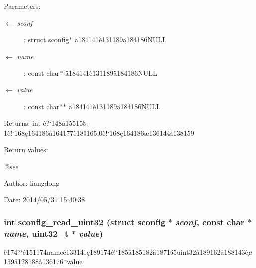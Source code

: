 \begin{Desc}
\item[Parameters:]
\begin{description}
\item[\mbox{$\leftarrow$} {\em sconf}]: struct sconfig$\ast$ \"{a}184141\`{e}131189\"{a}184186NULL \item[\mbox{$\leftarrow$} {\em name}]: const char$\ast$ \"{a}184141\`{e}131189\"{a}184186NULL \item[\mbox{$\leftarrow$} {\em value}]: const char$\ast$$\ast$ \"{a}184141\`{e}131189\"{a}184186NULL \end{description}
\end{Desc}
\begin{Desc}
\item[Returns:]int \`{e}?`148\aa{}155158-1\`{e}!`168\c{c}164186\aa{}164177\`{e}180165,0\`{e}!`168\c{c}164186\ae{}136144\aa{}138159 \end{Desc}
\begin{Desc}
\item[Return values:]
\begin{description}
\item[{\em @see}]\end{description}
\end{Desc}
\begin{Desc}
\item[Author:]liangdong \end{Desc}
\begin{Desc}
\item[Date:]2014/05/31 15:40:38 \end{Desc}
\subsubsection{\setlength{\rightskip}{0pt plus 5cm}int sconfig\_\-read\_\-uint32 (struct sconfig $\ast$ {\em sconf}, const char $\ast$ {\em name}, uint32\_\-t $\ast$ {\em value})}\label{sconfig_8c_a8}


\`{e}174?`\'{e}151174name\'{e}133141\c{c}189174\'{e}!`185\aa{}185182\"{a}187165uint32\aa{}189162\aa{}188143\`{e}$\mu$139\aa{}128188\aa{}136176$\ast$value 

